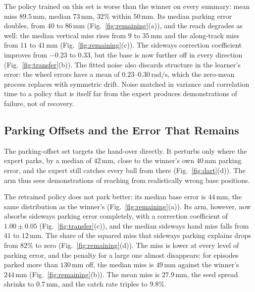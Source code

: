 \documentclass[conference]{IEEEtran}
\begin{document}
The policy trained on this set is worse than the winner on every summary: mean miss $89.5\,\mathrm{mm}$, median $73\,\mathrm{mm}$, $32\%$ within $50\,\mathrm{mm}$. Its median parking error doubles, from $40$ to $86\,\mathrm{mm}$ (Fig.~\ref{fig:remaining}(a)), and the reach degrades as well: the median vertical miss rises from $9$ to $35\,\mathrm{mm}$ and the along-track miss from $11$ to $41\,\mathrm{mm}$ (Fig.~\ref{fig:remaining}(c)). The sideways correction coefficient improves from $-0.23$ to $0.33$, but the base is now further off in every direction (Fig.~\ref{fig:transfer}(b)). The fitted noise also discards structure in the learner's error: the wheel errors have a mean of $0.23$--$0.30\,\mathrm{rad/s}$, which the zero-mean process replaces with symmetric drift. Noise matched in variance and correlation time to a policy that is itself far from the expert produces demonstrations of failure, not of recovery.

\subsection{Parking Offsets and the Error That Remains}
The parking-offset set targets the hand-over directly. It perturbs only where the expert parks, by a median of $42\,\mathrm{mm}$, close to the winner's own $40\,\mathrm{mm}$ parking error, and the expert still catches every ball from there (Fig.~\ref{fig:dart}(d)). The arm thus sees demonstrations of reaching from realistically wrong base positions.

The retrained policy does not park better: its median base error is $44\,\mathrm{mm}$, the same distribution as the winner's (Fig.~\ref{fig:remaining}(a)). Its arm, however, now absorbs sideways parking error completely, with a correction coefficient of $1.00\pm0.05$ (Fig.~\ref{fig:transfer}(c)), and the median sideways hand miss falls from $41$ to $12\,\mathrm{mm}$. The share of the squared miss that sideways parking explains drops from $82\%$ to zero (Fig.~\ref{fig:remaining}(d)). The miss is lower at every level of parking error, and the penalty for a large one almost disappears: for episodes parked more than $130\,\mathrm{mm}$ off, the median miss is $49\,\mathrm{mm}$ against the winner's $244\,\mathrm{mm}$ (Fig.~\ref{fig:remaining}(b)). The mean miss is $27.9\,\mathrm{mm}$, the seed spread shrinks to $0.7\,\mathrm{mm}$, and the catch rate triples to $9.8\%$.
\end{document}
